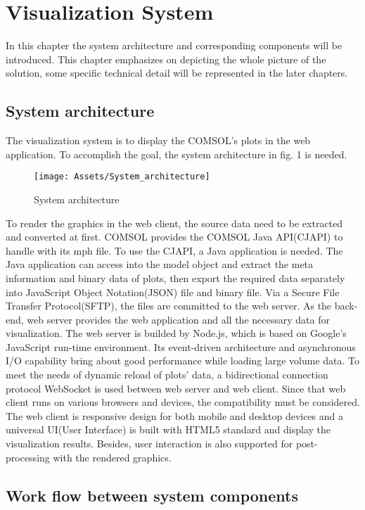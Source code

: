 \chapter{Visualization System}
In this chapter the system architecture and corresponding components will be introduced. This chapter emphasizes on depicting the whole picture of the solution, some specific technical detail will be represented in the later chapters.

\section{System architecture}

The visualization system is to display the COMSOL's plots in the web application. To accomplish the goal, the system architecture in fig. 1 is needed.

\begin{figure}[htb]
  \centering
  \texttt{[image: Assets/System\_architecture]}
  \caption{System architecture}
\end{figure}

To render the graphics in the web client, the source data need to be extracted and converted at first. COMSOL provides the COMSOL Java API(CJAPI) to handle with its mph file. To use the CJAPI, a Java application is needed. The Java application can access into the model object and extract the meta information and binary data of plots, then export the required data separately into JavaScript Object Notation(JSON) file and binary file. Via a Secure File Transfer Protocol(SFTP), the files are committed to the web server. As the back-end, web server provides the web application and all the necessary data for visualization. The web server is builded by Node.js, which is based on Google's JavaScript run-time environment. Its event-driven architecture and asynchronous I/O capability bring about good performance while loading large volume data. To meet the needs of dynamic reload of plots' data, a bidirectional connection protocol WebSocket is used between web server and web client. Since that web client runs on various browsers and devices, the compatibility must be considered. The web client is responsive design for both mobile and desktop devices and a universal UI(User Interface) is built with HTML5 standard and display the visualization results. Besides, user interaction is also supported for post-processing with the rendered graphics.

\section{Work flow between system components} 